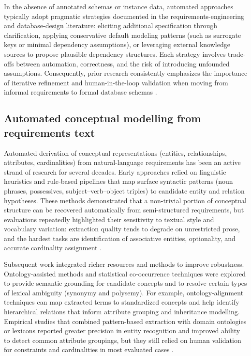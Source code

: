 In the absence of annotated schemas or instance data, automated approaches typically adopt pragmatic strategies documented in the requirements-engineering and database-design literature: eliciting additional specification through clarification, applying conservative default modeling patterns (such as surrogate keys or minimal dependency assumptions), or leveraging external knowledge sources to propose plausible dependency structures. Each strategy involves trade-offs between automation, correctness, and the risk of introducing unfounded assumptions. Consequently, prior research consistently emphasizes the importance of iterative refinement and human-in-the-loop validation when moving from informal requirements to formal database schemas \cite{codd1970,chen1976,huhtala1999tane,Why_AI_Agents_Still_Need_You}.
\subsection{Automated conceptual modelling from requirements text}
\label{sec:conceptual-modelling}

Automated derivation of conceptual representations (entities, relationships, attributes, cardinalities) from natural-language requirements has been an active strand of research for several decades. Early approaches relied on linguistic heuristics and rule-based pipelines that map surface syntactic patterns (noun phrases, possessives, subject–verb–object triples) to candidate entity and relation hypotheses. These methods demonstrated that a non-trivial portion of conceptual structure can be recovered automatically from semi-structured requirements, but evaluations repeatedly highlighted their sensitivity to textual style and vocabulary variation: extraction quality tends to degrade on unrestricted prose, and the hardest tasks are identification of associative entities, optionality, and accurate cardinality assignment \cite{robeer2015conceptual,navarro2009}.

Subsequent work integrated richer resources and methods to improve robustness. Ontology-assisted methods and statistical co-occurrence techniques were explored to provide semantic grounding for candidate concepts and to resolve certain types of lexical ambiguity (synonymy and polysemy). For example, ontology-alignment techniques can map extracted terms to standardized concepts and help identify hierarchical relations that inform attribute grouping and inheritance modelling. Empirical studies that combined pattern-based extraction with domain ontologies or lexicons reported greater precision in entity recognition and improved ability to detect common attribute groupings, but they still relied on human validation for constraints and cardinalities in most evaluated cases \cite{navarro2009,robeer2015conceptual}.

